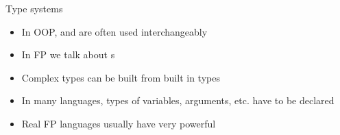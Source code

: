 \begin{frame}{Type systems}
	\begin{itemize}
		\item In OOP,  and  are often used interchangeably
		\item In FP we talk about s
		\item Complex types can be built from built in types \\
		\item In many languages, types of variables, arguments, etc. have to be declared 
		\item Real FP languages usually have very powerful %
	\end{itemize}
	
\end{frame}


